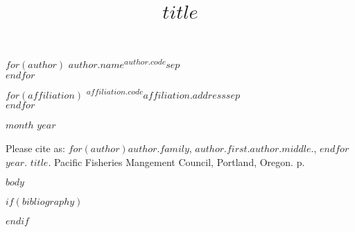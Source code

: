 \thispagestyle{empty} %
\begin{center}
\title{$title$}

\vspace{1.5cm}
{\Large\textbf{}}

\vspace{0.5cm}
$for(author)$
$author.name$\textsuperscript{$author.code$}$sep$\\
$endfor$
\end{center}
\vspace{0.5cm}
$for(affiliation)$
\textsuperscript{$affiliation.code$}$affiliation.address$$sep$\\
$endfor$
\vspace{0.5cm}

\begin{center}
{$month$} {$year$}
\end{center}

\vspace*{\fill}
\noindent Please cite as: $for(author)$$author.family$, $author.first$.$author.middle$., $endfor$$year$. $title$.
Pacific Fisheries Mangement Council, Portland, Oregon. \pageref{LastPage} p.

\newpage
\thispagestyle{empty} %
\tableofcontents

$body$

$if(bibliography)$

$endif$
